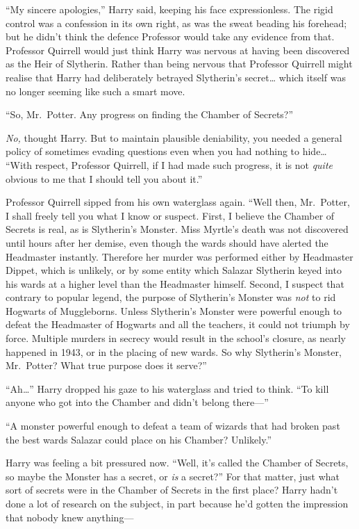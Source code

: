 ``My sincere apologies,'' Harry said, keeping his face expressionless.
The rigid control was a confession in its own right, as was the sweat
beading his forehead; but he didn't think the defence Professor would
take any evidence from that. Professor Quirrell would just think Harry
was nervous at having been discovered as the Heir of Slytherin. Rather
than being nervous that Professor Quirrell might realise that Harry had
deliberately betrayed Slytherin's secret\ldots{} which itself was no
longer seeming like such a smart move.

``So, Mr.~Potter. Any progress on finding the Chamber of Secrets?''

\emph{No,} thought Harry. But to maintain plausible deniability, you
needed a general policy of sometimes evading questions even when you had
nothing to hide\ldots{} ``With respect, Professor Quirrell, if I had
made such progress, it is not \emph{quite} obvious to me that I should
tell you about it.''

Professor Quirrell sipped from his own waterglass again. ``Well then,
Mr.~Potter, I shall freely tell you what I know or suspect. First, I
believe the Chamber of Secrets is real, as is Slytherin's Monster. Miss
Myrtle's death was not discovered until hours after her demise, even
though the wards should have alerted the Headmaster instantly. Therefore
her murder was performed either by Headmaster Dippet, which is unlikely,
or by some entity which Salazar Slytherin keyed into his wards at a
higher level than the Headmaster himself. Second, I suspect that
contrary to popular legend, the purpose of Slytherin's Monster was
\emph{not} to rid Hogwarts of Muggleborns. Unless Slytherin's Monster
were powerful enough to defeat the Headmaster of Hogwarts and all the
teachers, it could not triumph by force. Multiple murders in secrecy
would result in the school's closure, as nearly happened in 1943, or in
the placing of new wards. So why Slytherin's Monster, Mr.~Potter? What
true purpose does it serve?''

``Ah\ldots{}'' Harry dropped his gaze to his waterglass and tried to
think. ``To kill anyone who got into the Chamber and didn't belong
there---''

``A monster powerful enough to defeat a team of wizards that had broken
past the best wards Salazar could place on his Chamber? Unlikely.''

Harry was feeling a bit pressured now. ``Well, it's called the Chamber
of Secrets, so maybe the Monster has a secret, or \emph{is} a secret?''
For that matter, just what sort of secrets were in the Chamber of
Secrets in the first place? Harry hadn't done a lot of research on the
subject, in part because he'd gotten the impression that nobody knew
anything---

